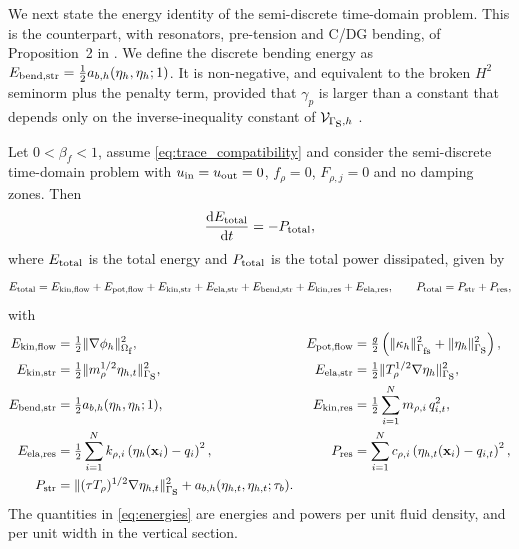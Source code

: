 We next state the energy identity of the semi-discrete time-domain problem. This is the counterpart, with resonators, pre-tension and C/DG bending, of Proposition~2 in \cite{colomes2023monolithic}. We define the discrete bending energy as $E_{\mbox{\scriptsize bend,str}}=\tfrac12 a_{b,h}(\eta_h,\eta_h;1)$. It is non-negative, and equivalent to the broken $H^2$ seminorm plus the penalty term, provided that $\gamma_p$ is larger than a constant that depends only on the inverse-inequality constant of $\mathcal{V}_{\Gamma_{\mbox{s}},h}$ \cite{engel2002continuous}.

\begin{proposition}\label{prop:energy}
Let $0<\beta_f<1$, assume \eqref{eq:trace_compatibility} and consider the semi-discrete time-domain problem with $u_{\text{\scriptsize in}}=u_{\text{\scriptsize out}}=0$, $f_\rho=0$, $F_{\rho,j}=0$ and no damping zones. Then
\begin{equation}\label{eq:energy}
    \frac{\mathrm{d}E_{\mbox{\scriptsize total}}}{\mathrm{d}t} = -P_{\mbox{\scriptsize total}},
\end{equation}
where $E_{\mbox{\scriptsize total}}$ is the total energy and $P_{\mbox{\scriptsize total}}$ is the total power dissipated, given by
\begin{equation}\label{eq:energy_total}
    E_{\mbox{\scriptsize total}}=E_{\mbox{\scriptsize kin,flow}}+E_{\mbox{\scriptsize pot,flow}}+E_{\mbox{\scriptsize kin,str}}+E_{\mbox{\scriptsize ela,str}}+E_{\mbox{\scriptsize bend,str}}+E_{\mbox{\scriptsize kin,res}}+E_{\mbox{\scriptsize ela,res}},
    \qquad
    P_{\mbox{\scriptsize total}}=P_{\mbox{\scriptsize str}}+P_{\mbox{\scriptsize res}},
\end{equation}
with
\begin{subequations}\label{eq:energies}
\begin{align}
    E_{\mbox{\scriptsize kin,flow}}&=\tfrac12\|\nabla\phi_h\|^2_{\Omega_{\mbox{\scriptsize f}}}, &
    E_{\mbox{\scriptsize pot,flow}}&=\tfrac{g}{2}\left(\|\kappa_h\|^2_{\Gamma_{\mbox{\scriptsize fs}}}+\|\eta_h\|^2_{\Gamma_{\mbox{s}}}\right),\\
    E_{\mbox{\scriptsize kin,str}}&=\tfrac12\|m_\rho^{1/2}\eta_{h,t}\|^2_{\Gamma_{\mbox{s}}}, &
    E_{\mbox{\scriptsize ela,str}}&=\tfrac12\|T_\rho^{1/2}\nabla\eta_h\|^2_{\Gamma_{\mbox{s}}},\\
    E_{\mbox{\scriptsize bend,str}}&=\tfrac12 a_{b,h}(\eta_h,\eta_h;1), &
    E_{\mbox{\scriptsize kin,res}}&=\tfrac12\sum_{i=1}^Nm_{\rho,i}\,q_{i,t}^2,\\
    E_{\mbox{\scriptsize ela,res}}&=\tfrac12\sum_{i=1}^Nk_{\rho,i}\left(\eta_h(\mathbf{x}_i)-q_i\right)^2, &
    P_{\mbox{\scriptsize res}}&=\sum_{i=1}^Nc_{\rho,i}\left(\eta_{h,t}(\mathbf{x}_i)-q_{i,t}\right)^2,\\
    P_{\mbox{\scriptsize str}}&=\|(\tau T_\rho)^{1/2}\nabla\eta_{h,t}\|^2_{\Gamma_{\mbox{s}}}+a_{b,h}(\eta_{h,t},\eta_{h,t};\tau_b). \label{eq:powDissTime}
\end{align}
\end{subequations}
The quantities in \eqref{eq:energies} are energies and powers per unit fluid density, and per unit width in the vertical section.
\end{proposition}
